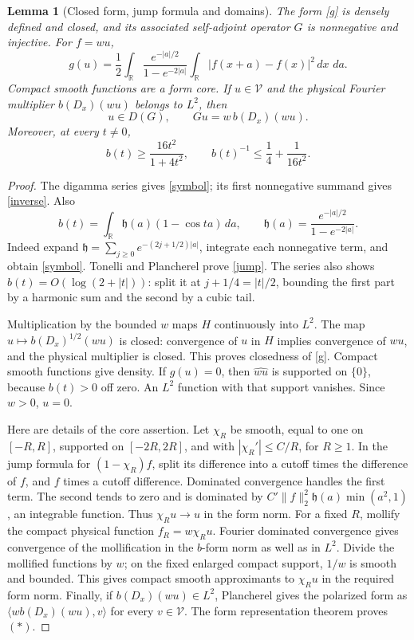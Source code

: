\documentclass[11pt]{article}
\newtheorem{lemma}[theorem]{Lemma}
\theoremstyle{remark}
\newcommand{\dd}{\,d}
\newcommand{\R}{\mathbb R}
\begin{document}
\begin{lemma}[Closed form, jump formula and domains]\label{closed}
The form \eqref{g} is densely defined and closed, and its associated
self-adjoint operator \(G\) is nonnegative and injective.
For \(f=wu\),
\begin{equation}\label{jump}
 g(u)=\frac12\int_\R
       \frac{e^{-|a|/2}}{1-e^{-2|a|}}
          \int_\R |f(x+a)-f(x)|^2\dd x\,\dd a.
\end{equation}
Compact smooth functions are a form core.
If \(u\in\mathcal V\) and the physical Fourier multiplier
\(b(D_x)(wu)\) belongs to \(L^2\), then
\[
 u\in D(G),\qquad Gu=w\,b(D_x)(wu).
 \tag{\(\ast\)}
\]
Moreover, at every \(t\ne0\),
\begin{equation}\label{inverse}
 b(t)\ge\frac{16t^2}{1+4t^2},\qquad
 b(t)^{-1}\le\frac14+\frac1{16t^2}.
\end{equation}
\end{lemma}
\begin{proof}
The digamma series gives \eqref{symbol}; its first nonnegative
summand gives \eqref{inverse}. Also
\[
 b(t)=\int_\R \mathfrak h(a)(1-\cos ta)\dd a,\qquad
 \mathfrak h(a)=\frac{e^{-|a|/2}}{1-e^{-2|a|}}.
\]
Indeed expand \(\mathfrak h=\sum_{j\ge0}e^{-(2j+1/2)|a|}\),
integrate each nonnegative term, and obtain \eqref{symbol}.
Tonelli and Plancherel prove \eqref{jump}.
The series also shows \(b(t)=O(\log(2+|t|))\):
split it at \(j+1/4=|t|/2\), bounding the first part by a
harmonic sum and the second by a cubic tail.

Multiplication by the bounded \(w\) maps \(H\) continuously into
\(L^2\). The map \(u\mapsto b(D_x)^{1/2}(wu)\) is closed:
convergence of \(u\) in \(H\) implies convergence of \(wu\), and
the physical multiplier is closed. This proves closedness of
\eqref{g}. Compact smooth functions give density.
If \(g(u)=0\), then \(\widehat{wu}\) is supported on \(\{0\}\),
because \(b(t)>0\) off zero. An \(L^2\) function with that support
vanishes. Since \(w>0\), \(u=0\).

Here are details of the core assertion. Let \(\chi_R\) be smooth,
equal to one on \([-R,R]\), supported on \([-2R,2R]\), and with
\(|\chi_R'|\le C/R\), for \(R\ge1\).
In the jump formula for \((1-\chi_R)f\), split its difference into
a cutoff times the difference of \(f\), and \(f\) times a cutoff
difference. Dominated convergence handles the first term.
The second tends to zero and is dominated by
\(C'\|f\|_2^2\mathfrak h(a)\min(a^2,1)\), an integrable function.
Thus \(\chi_Ru\to u\) in the form norm.
For a fixed \(R\), mollify the compact physical function
\(f_R=w\chi_Ru\). Fourier dominated convergence gives convergence
of the mollification in the \(b\)-form norm as well as in \(L^2\).
Divide the mollified functions by \(w\); on the fixed enlarged
compact support, \(1/w\) is smooth and bounded. This gives compact
smooth approximants to \(\chi_Ru\) in the required form norm.
Finally, if \(b(D_x)(wu)\in L^2\), Plancherel gives the polarized
form as \(\langle w b(D_x)(wu),v\rangle\) for every
\(v\in\mathcal V\). The form representation theorem proves
\((\ast)\).
\end{proof}
\end{document}
